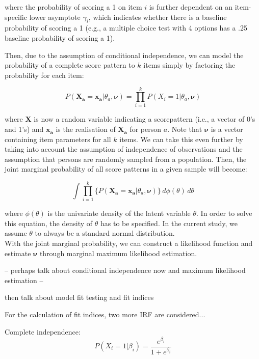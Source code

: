\documentclass[Royal,sageapa,times,doublespace]{sagej}
\begin{document}
where the probability of scoring a 1 on item $i$ is further dependent on an item-specific lower asymptote $\gamma_i$, which indicates whether there is
a baseline probability of scoring a 1 (e.g., a multiple choice test with 4 options has a .25 baseline probability of scoring a 1).

Then, due to the assumption of conditional independence, we can model the probability of a complete score pattern to $k$ items simply by factoring the probability for each item:

\begin{equation}
P(\boldsymbol{X_a} = \boldsymbol{x_a} | \theta_a, \boldsymbol{\nu}) = \prod_{i=1}^{k} P(X_i = 1 | \theta_a, \boldsymbol{\nu})
\end{equation}

where $\boldsymbol{X}$ is now a random variable indicating a scorepattern (i.e., a vector of 0's and 1's) and $\boldsymbol{x_a}$ is the realisation of $\boldsymbol{X_a}$ for person $a$. Note that $\boldsymbol{\nu}$ is a vector containing item parameters for all $k$ items. We can take this even further by taking into account the assumption of independence of observations and the assumption that persons are randomly sampled from a population. Then, the joint marginal probability of all score patterns in a given sample will become:

\begin{equation}
\int \prod_{i=1}^{k} \{ P(\boldsymbol{X_a} = \boldsymbol{x_a} | \theta_a, \boldsymbol{\nu}) \} \,d\phi(\theta)\,d\theta
\end{equation}

where $\phi(\theta)$ is the univariate density of the latent variable $\theta$. In order to solve this equation, the density of $\theta$ has to be specified. In the current study, we assume $\theta$ to always be a standard normal distribution. \\
\indent With the joint marginal probability, we can construct a likelihood function and estimate $\boldsymbol{\nu}$ through marginal maximum likelihood estimation. 


-- perhaps talk about conditional independence now and maximum likelihood estimation --

then talk about model fit testing and fit indices

For the calculation of fit indices, two more IRF are considered...

Complete independence:
\begin{equation}
P(X_i = 1 | \beta_{i}) = \frac{e^{\beta_{i}}}{1 + e^{\beta_{i}}}
\end{equation}
\end{document}
